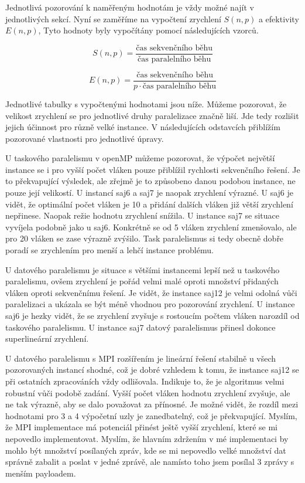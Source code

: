 \documentclass{article} \oddsidemargin=-5mm
\begin{document}
Jednotlivá pozorování k naměřeným hodnotám je vždy možné najít v jednotlivých sekcí. Nyní se zaměříme na vypočtení zrychlení $S(n,p)$ a efektivity $E(n,p)$, Tyto hodnoty byly vypočítány pomocí následujících vzorců.

\begin{equation}
S(n,p) = \frac{\text{čas sekvenčního běhu}}{\text{čas paralelního běhu}}
\end{equation}

\begin{equation}
E(n,p) = \frac{\text{čas sekvenčního běhu}}{p \cdot \text{čas paralelního běhu}}
\end{equation}

Jednotlivé tabulky s vypočtenými hodnotami jsou níže. Můžeme pozorovat, že velikost zrychlení se pro jednotlivé druhy paralelizace značně liší. Jde tedy rozlišit jejich účinnost pro různě velké instance. V následujících odstavcích přiblížím pozorované vlastnosti pro jednotlivé úpravy.

U taskového paralelismu v openMP můžeme pozorovat, že výpočet největší instance se i pro vyšší počet vláken pouze přiblížil rychlosti sekvenčního řešení. Je to překvapující výsledek, ale zřejmě je to způsobeno danou podobou instance, ne pouze její velikostí. U instancí saj6 a saj7 je naopak zrychlení výrazné. U saj6 je vidět, že optimální počet vláken je 10 a přidání dalších vláken již větší zrychlení nepřinese. Naopak režie hodnotu zrychlení snížila. U instance saj7 se situace vyvíjela podobně jako u saj6. Konkrétně se od 5 vláken zrychlení zmenšovalo, ale pro 20 vláken se zase výrazně zvýšilo. Task paralelismus si tedy obecně dobře poradí se zrychlením pro menší a lehčí instance problému.

U datového paralelismu je situace s většími instancemi lepší než u taskového paralelismu, ovšem zrychlení je pořád velmi malé oproti množství přidaných vláken oproti sekvenčnímu řešení. Je vidět, že instance saj12 je velmi odolná vůči paralelizaci a ukázala se být méně vhodnou pro pozorování zrychlení. U instance saj6 je hezky vidět, že se zrychlení zvyšuje s rostoucím počtem vláken narozdíl od taskového paralelismu. U instance saj7 datový paralelismus přinesl dokonce superlineární zrychlení.

U datového paralelismu s MPI rozšířením je lineární řešení stabilně u všech pozorovaných instancí shodné, což je dobré vzhledem k tomu, že instance saj12 se při ostatních zpracováních vždy odlišovala. Indikuje to, že je algoritmus velmi robustní vůči podobě zadání. Vyšší počet vláken hodnotu zrychlení zvyšuje, ale ne tak výrazně, aby se dalo považovat za přínosné. Je možné vidět, že rozdíl mezi hodnotami pro 3 a 4 výpočetní uzly je zanedbatelný, což je překvapující. Myslím, že MPI implementace má potenciál přinést ještě vyšší zrychlení, které se mi nepovedlo implementovat. Myslím, že hlavním zdržením v mé implementaci by mohlo být množství posílaných zpráv, kde se mi nepovedlo velké množství dat správně zabalit a poslat v jedné zprávě, ale namísto toho jsem posílal 3 zprávy s menším payloadem.
\end{document}
